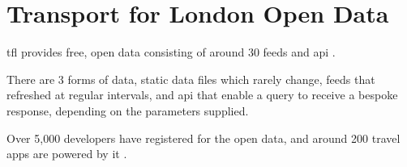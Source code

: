 \section{Transport for London Open Data}



\par \acrshort{tfl} provides free, open data consisting of around 30 feeds and \acrshort{api} \cite{open_data}.

\par There are 3 forms of data, static data files which rarely change, feeds that refreshed at regular intervals, and \acrshort{api} that enable a query to receive a bespoke response, depending on the parameters supplied.

Over 5,000 developers have registered for the open data\cite{open_data}, and around 200 travel apps are powered by it \cite{tfl_annual_report_13/14}.
